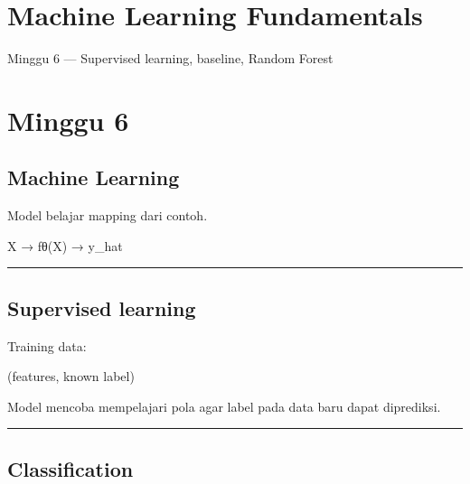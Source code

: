 \documentclass[
  indonesian,
  letterpaper,
  DIV=11,
  numbers=noendperiod]{scrreprt}
\newenvironment{Shaded}{\begin{snugshade}}{\end{snugshade}}
\newcommand{\NormalTok}[1]{\textcolor[rgb]{0.00,0.23,0.31}{#1}}
\begin{document}
\chapter{Machine Learning
Fundamentals}\label{machine-learning-fundamentals}

Minggu 6 --- Supervised learning, baseline, Random Forest

\hfill\break

\chapter{Minggu 6}\label{minggu-6}

\section{Machine Learning}\label{machine-learning}

Model belajar mapping dari contoh.

\begin{Shaded}
\begin{Highlighting}[]
\NormalTok{X → fθ(X) → y\_hat}
\end{Highlighting}
\end{Shaded}

\begin{center}\rule{0.5\linewidth}{0.5pt}\end{center}

\section{Supervised learning}\label{supervised-learning}

Training data:

\begin{Shaded}
\begin{Highlighting}[]
\NormalTok{(features, known label)}
\end{Highlighting}
\end{Shaded}

Model mencoba mempelajari pola agar label pada data baru dapat
diprediksi.

\begin{center}\rule{0.5\linewidth}{0.5pt}\end{center}

\section{Classification}\label{classification}
\end{document}
